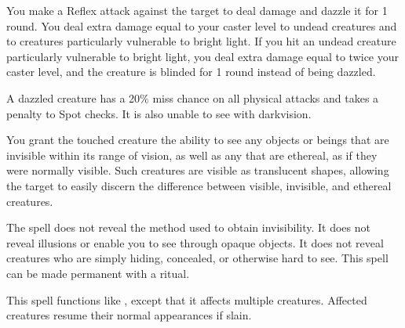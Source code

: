 \begin{spelleffect}
    You make a Reflex attack against the target to deal damage and dazzle it for 1 round. You deal extra damage equal to your caster level to undead creatures and to creatures particularly vulnerable to bright light. If you hit an undead creature particularly vulnerable to bright light, you deal extra damage equal to twice your caster level, and the creature is blinded for 1 round instead of being dazzled.
\end{spelleffect}
\begin{spellnotes}
    A dazzled creature has a 20\% miss chance on all physical attacks and takes a  penalty to Spot checks. It is also unable to see with darkvision.
\end{spellnotes}

\spelldur{\durlong \dismissable}
\begin{spelleffect}
    You grant the touched creature the ability to see any objects or beings that are invisible within its range of vision, as well as any that are ethereal, as if they were normally visible. Such creatures are visible as translucent shapes, allowing the target to easily discern the difference between visible, invisible, and ethereal creatures.
\end{spelleffect}
\begin{spellnotes}
    The spell does not reveal the method used to obtain invisibility. It does not reveal illusions or enable you to see through opaque objects. It does not reveal creatures who are simply hiding, concealed, or otherwise hard to see.
    This spell can be made permanent with a  ritual.
\end{spellnotes}

\spelldur{\durlong \dismissable}
\begin{spelleffect}
    This spell functions like , except that it affects multiple creatures. Affected creatures resume their normal appearances if slain.
\end{spelleffect}

